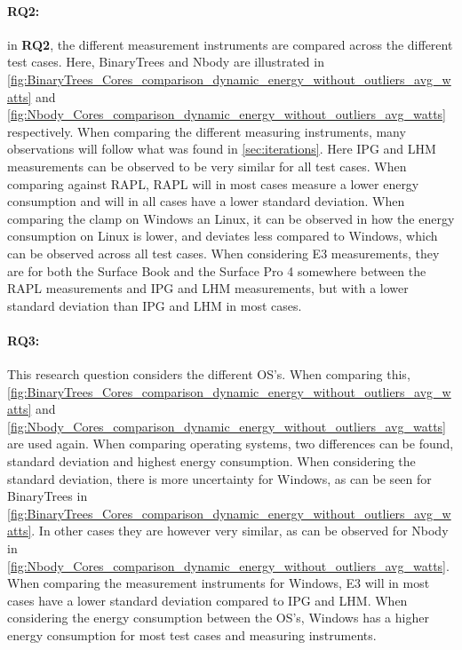 \paragraph*{RQ2:}  in \textbf{RQ2}, the different measurement instruments are compared across the different test cases. Here, BinaryTrees and Nbody are illustrated in  \cref*{fig:BinaryTrees_Cores_comparison_dynamic_energy_without_outliers_avg_watts} and \cref*{fig:Nbody_Cores_comparison_dynamic_energy_without_outliers_avg_watts} respectively. When comparing the different measuring instruments, many observations will follow what was found in \cref{sec:iterations}. Here IPG and LHM measurements can be observed to be very similar for all test cases. When comparing against RAPL, RAPL will in most cases measure a lower energy consumption and will in all cases have a lower standard deviation. When comparing the clamp on Windows an Linux, it can be observed in how the energy consumption on Linux is lower, and deviates less compared to Windows, which can be observed across all test cases. When considering E3 measurements, they are for both the Surface Book and the Surface Pro 4 somewhere between the RAPL measurements and IPG and LHM measurements, but with a lower standard deviation than IPG and LHM in most cases.




\paragraph*{RQ3:} This research question considers the different OS's. When comparing this, \cref*{fig:BinaryTrees_Cores_comparison_dynamic_energy_without_outliers_avg_watts} and \cref*{fig:Nbody_Cores_comparison_dynamic_energy_without_outliers_avg_watts} are used again. When comparing operating systems, two differences can be found, standard deviation and highest energy consumption. When considering the standard deviation, there is more uncertainty for Windows, as can be seen for BinaryTrees in \cref*{fig:BinaryTrees_Cores_comparison_dynamic_energy_without_outliers_avg_watts}. In other cases they are however very similar, as can be observed for Nbody in \cref*{fig:Nbody_Cores_comparison_dynamic_energy_without_outliers_avg_watts}. When comparing the measurement instruments for Windows, E3 will in most cases have a lower standard deviation compared to IPG and LHM. When considering the energy consumption between the OS's, Windows has a higher energy consumption for most test cases and measuring instruments.

